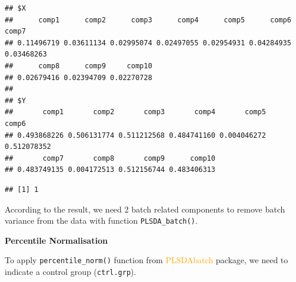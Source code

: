 \documentclass[
]{book}
\newenvironment{Shaded}{\begin{snugshade}}{\end{snugshade}}
\newcommand{\AttributeTok}[1]{\textcolor[rgb]{0.77,0.63,0.00}{#1}}
\newcommand{\DecValTok}[1]{\textcolor[rgb]{0.00,0.00,0.81}{#1}}
\newcommand{\DocumentationTok}[1]{\textcolor[rgb]{0.56,0.35,0.01}{\textbf{\textit{#1}}}}
\newcommand{\FunctionTok}[1]{\textcolor[rgb]{0.00,0.00,0.00}{#1}}
\newcommand{\NormalTok}[1]{#1}
\newcommand{\OtherTok}[1]{\textcolor[rgb]{0.56,0.35,0.01}{#1}}
\newcommand{\SpecialCharTok}[1]{\textcolor[rgb]{0.00,0.00,0.00}{#1}}
\begin{document}
\begin{verbatim}
## $X
##      comp1      comp2      comp3      comp4      comp5      comp6      comp7 
## 0.11496719 0.03611134 0.02995074 0.02497055 0.02954931 0.04284935 0.03468263 
##      comp8      comp9     comp10 
## 0.02679416 0.02394709 0.02270728 
## 
## $Y
##       comp1       comp2       comp3       comp4       comp5       comp6 
## 0.493868226 0.506131774 0.511212568 0.484741160 0.004046272 0.512078352 
##       comp7       comp8       comp9      comp10 
## 0.483749135 0.004172513 0.512156744 0.483406313
\end{verbatim}

\begin{Shaded}
\end{Shaded}

\begin{verbatim}
## [1] 1
\end{verbatim}

According to the result, we need 2 batch related components to remove batch variance from the data with function \texttt{PLSDA\_batch()}.

\begin{Shaded}
\end{Shaded}

\textbf{Percentile Normalisation}

To apply \texttt{percentile\_norm()} function from \textcolor{orange}{PLSDAbatch} package, we need to indicate a control group (\texttt{ctrl.grp}).
\end{document}
